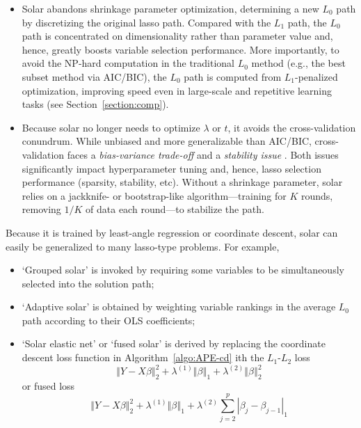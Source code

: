 \documentclass[12pt]{article}
\begin{document}
\begin{itemize}

  \item Solar abandons shrinkage parameter optimization, determining a new $L_0$ path by discretizing the original lasso path. Compared with the $L_1$ path, the $L_0$ path is concentrated on dimensionality rather than parameter value and, hence, greatly boosts variable selection performance. More importantly, to avoid the NP-hard computation in the traditional $L_0$ method (e.g., the best subset method via AIC/BIC), the $L_0$ path is computed from $L_1$-penalized optimization, improving speed even in large-scale and repetitive learning tasks (see Section~\ref{section:comp}).

  \item Because solar no longer needs to optimize $\lambda$ or $t$, it avoids the cross-validation conundrum. While unbiased and more generalizable than AIC/BIC, cross-validation faces a \emph{bias-variance trade-off} \citep{kearns1999algorithmic} and a \emph{stability issue} \citep{lim2016estimation}. Both issues significantly impact hyperparameter tuning and, hence, lasso selection performance (sparsity, stability, etc). Without a shrinkage parameter, solar relies on a jackknife- or bootstrap-like algorithm---training for $K$ rounds, removing $1/K$ of data each round---to stabilize the path.

\end{itemize}

Because it is trained by least-angle regression or coordinate descent, solar can easily be generalized to many lasso-type problems. For example,

\begin{itemize}
  \item `Grouped solar' is invoked by requiring some variables to be simultaneously selected into the solution path;
  \item `Adaptive solar' is obtained by weighting variable rankings in the average $L_0$ path according to their OLS coefficients;
  \item `Solar elastic net' or `fused solar' is derived by replacing the coordinate descent loss function in Algorithm~\ref{algo:APE-cd} ith the $L_1$-$L_2$ loss
    \begin{equation}
      \left\Vert Y -X\beta \right\Vert_2^2 + \lambda^{(1)} \left\Vert \beta \right\Vert_1 + \lambda^{(2)} \left\Vert \beta \right\Vert_2^2
    \end{equation}
    or fused loss
    \begin{equation}
      \left\Vert Y -X\beta \right\Vert_2^2 + \lambda^{(1)} \left\Vert \beta \right\Vert_1 + \lambda^{(2)} \sum_{j=2}^{p} \left\vert \beta_j - \beta_{j-1} \right\vert_1
    \end{equation}
\end{itemize}
\end{document}
